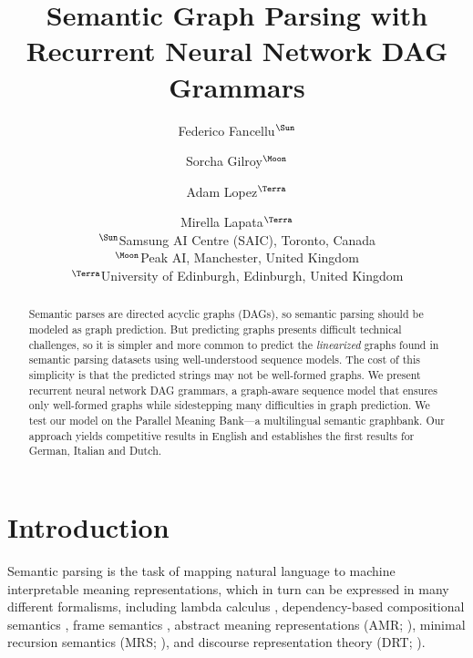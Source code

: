 \documentclass[11pt,a4paper]{article}
\title{Semantic Graph Parsing with Recurrent Neural Network DAG Grammars}
\author{Federico Fancellu$^{\textrm\Sun}$ \and Sorcha Gilroy$^{\textrm\Moon}$ \and Adam Lopez$^{\textrm\Terra}$ \and Mirella Lapata$^{\textrm\Terra}$\\
$^{\textrm\Sun}$Samsung AI Centre (SAIC), Toronto, Canada\\
$^{\textrm\Moon}$Peak AI, Manchester, United Kingdom\\
$^{\textrm\Terra}$University of Edinburgh, Edinburgh, United Kingdom}
\date{}
\theoremstyle{plain}
\begin{document}
\maketitle
\begin{abstract}
 Semantic parses are directed acyclic graphs (DAGs), so semantic parsing should be modeled as graph prediction. But predicting graphs presents difficult technical challenges, so it is simpler and more common to predict the \emph{linearized} graphs found in semantic parsing datasets using well-understood sequence models. The cost of this simplicity is that the predicted strings may not be well-formed graphs. We present recurrent neural network DAG grammars, a graph-aware sequence model that ensures only well-formed graphs while sidestepping many difficulties in graph prediction. We test our model on the Parallel Meaning Bank---a multilingual semantic graphbank. Our approach yields competitive results in English and establishes the first results for German, Italian and Dutch.
\end{abstract}

\section{Introduction}
\label{sec:introduction-1}

Semantic parsing is the task of mapping natural language to machine
interpretable meaning representations, which in turn can be expressed
in many different formalisms, including lambda calculus
\cite{Montague:1973}, dependency-based compositional semantics
\cite{liang2011learning}, frame semantics \cite{baker1998berkeley},
abstract meaning representations (AMR; \citealt{amr}), minimal
recursion semantics (MRS; \citealt{copestake2005minimal}), and
discourse representation theory (DRT; \citealt{kamp1981theory}).
\end{document}
